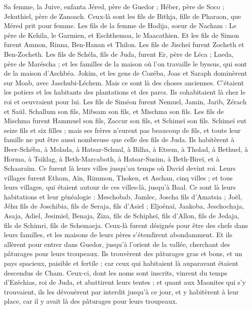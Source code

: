 \begin{multicols}{2}
Sa femme, la Juive, enfanta Jéred, père de Guedor ;  Héber, père de Soco ;  Jekuthiel, père de Zanoach. Ceux-là sont les fils de Bithja, fille de Pharaon, que Méred prit pour femme.
Les fils de la femme de Hodija, soeur de Nacham : Le père de Kehila, le Garmien, et Eschthemoa, le Maacathien.
Et les fils de Simon furent Amnon, Rinna, Ben-Hanan et Thilon. Les fils de Jischeï furent Zocheth et Ben-Zocheth.
Les fils de Schéla, fils de Juda, furent Er, père de Léca ; Laeda, père de Maréscha ; et les familles de la maison où l'on travaille le byssus, qui sont de la maison d'Aschbéa.
Jokim, et les gens de Cozéba, Joas et Saraph dominèrent sur Moab, avec Jaschubi-Léchem. Mais ce sont là des choses anciennes.
C’étaient les potiers et les habitants des plantations  et des parcs. Ils cohabitaient là chez le roi et oeuvraient pour lui.
Les fils de Siméon furent Nemuel, Jamin, Jarib, Zérach et Saül.
Schallum son fils, Mibsam son fils, et Mischma son fils.
Les fils de Mischma furent Hammuel son fils, Zaccur son fils, et Schimeï son fils.
Schimeï eut seize fils et six filles ; mais ses frères n'eurent pas beaucoup de fils, et toute leur famille ne put être aussi nombreuse que celle des fils de Juda.
Ils habitèrent à Beer-Schéba, à Molada, à Hatsar-Schual,
à Bilha, à Etsem, à Tholad,
à Bethuel, à Horma, à Tsiklag,
à Beth-Marcaboth, à Hatsar-Susim, à Beth-Bireï, et à Schaaraïm. Ce furent là leurs villes jusqu'au temps où David devint roi.
Leurs villages furent Etham, Aïn, Rimmon, Thoken, et Aschan, cinq villes ;
et tous leurs villages, qui étaient autour de ces villes-là, jusqu'à Baal. Ce sont là leurs habitations et leur généalogie :
Meschobab, Jamlec, Joscha fils d'Amatsia ;
Joël, Jéhu fils de Joschibia, fils de Seraja, fils d'Asiel ;
Eljoénaï, Jaakoba, Jeschochaja, Asaja, Adiel, Jesimiel, Benaja,
Ziza, fils de Schipheï, fils d'Allon, fils de Jedaja, fils de Schimri, fils de Schemaeja.
Ceux-là furent désignés pour être des chefs dans leurs familles, et les maisons de leurs pères s’étendirent abondamment.
Et ils allèrent pour entrer dans Guedor, jusqu'à l'orient de la vallée, cherchant des pâturages pour leurs troupeaux.
Ils trouvèrent des pâturages gras et bons, et un pays spacieux, paisible et fertile ; car ceux qui habitaient là auparavant étaient descendus de Cham.
Ceux-ci, dont les noms sont inscrits, vinrent du temps d'Ezéchias, roi de Juda, et abattirent leurs tentes ; et quant aux Maonites qui s’y trouvaient, ils les dévouèrent par interdit jusqu'à ce jour, et y habitèrent à leur place, car il y avait là des pâturages pour leurs troupeaux.

\end{multicols}
